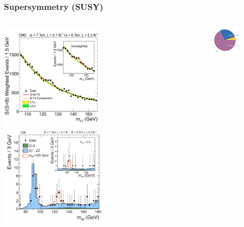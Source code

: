 \documentclass{beamer}
\begin{document}
\begin{frame}
  \frametitle{Supersymmetry (SUSY)}
  \begin{columns}
    \begin{column}{0.5\textwidth}
      \centering
      \includegraphics[width=0.49\textwidth]{figures/fig3.pdf}
      \includegraphics[width=0.51\textwidth]{figures/fig4.pdf}
    \end{column}
    \begin{column}{0.5\textwidth}
      \centering
      \includegraphics[width=0.7\textwidth]{susy/PlanckUniverse.png}\\

\end{column}
\end{columns}
\end{frame}
\end{document}
